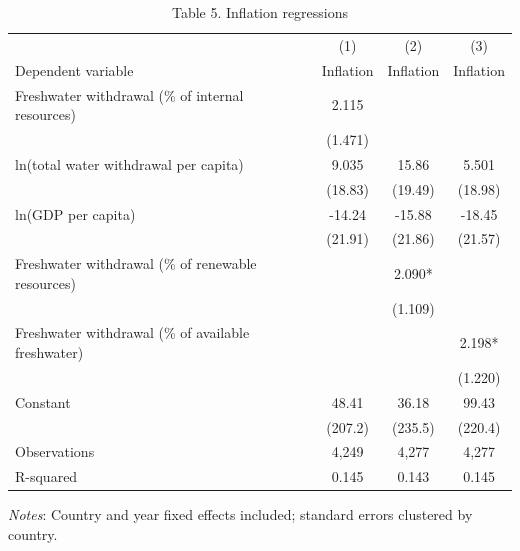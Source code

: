 \begin{table}[htbp]
\centering
\caption{Table 5. Inflation regressions}
\small
\begin{tabular}{lccc}
\hline
 & (1) & (2) & (3) \\
Dependent variable & Inflation & Inflation & Inflation \\
\hline
Freshwater withdrawal (\% of internal resources) & 2.115 &  &  \\
 & (1.471) &  &  \\
ln(total water withdrawal per capita) & 9.035 & 15.86 & 5.501 \\
 & (18.83) & (19.49) & (18.98) \\
ln(GDP per capita) & -14.24 & -15.88 & -18.45 \\
 & (21.91) & (21.86) & (21.57) \\
Freshwater withdrawal (\% of renewable resources) &  & 2.090* &  \\
 &  & (1.109) &  \\
Freshwater withdrawal (\% of available freshwater) &  &  & 2.198* \\
 &  &  & (1.220) \\
Constant & 48.41 & 36.18 & 99.43 \\
 & (207.2) & (235.5) & (220.4) \\
\hline
Observations & 4,249 & 4,277 & 4,277 \\
R-squared & 0.145 & 0.143 & 0.145 \\
\hline
\end{tabular}
\vspace{0.5em}
\parbox{0.95\textwidth}{\footnotesize \textit{Notes}: Country and year fixed effects included; standard errors clustered by country.}
\end{table}
